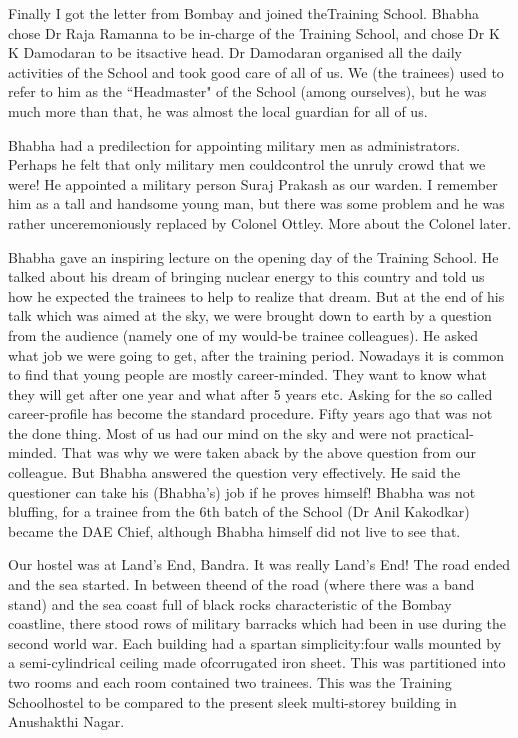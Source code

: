 Finally I got the letter from Bombay and joined the\break Training School. Bhabha chose Dr Raja Ramanna to be in-charge of the Training School, and chose Dr K K Damodaran to be its\break active head. Dr Damodaran organised all the daily activities of the School and took good care of all of us. We (the trainees) used to refer to him as the ``Headmaster" of the School (among ourselves), but he was much more than that, he was almost the local guardian for all of us.
 
Bhabha had a predilection for appointing military men as admini\-strators. Perhaps he felt that only military men could\break control the unruly crowd that we were! He appointed a military person Suraj Prakash as our warden. I remember him as a tall and handsome young man, but there was some problem and he was rather unceremoniously replaced by Colonel Ottley. More about the Colonel later.

Bhabha gave an inspiring lecture on the opening day of the Training School. He talked about his dream of bringing nuclear energy to this country and told us how he expected the trainees to help to realize that dream. But at the end of his talk which was aimed at the sky, we were brought down to earth by a question from the audience (namely  one of my would-be trainee collea\-gues). He asked what job we were going to get, after the training period. Nowadays it is common to find that young people are mostly career-minded. They want to know what they will get after one year and what after 5 years etc. Asking for the so called career-profile has become the standard procedure. Fifty years ago that was not the done thing. Most of us had our mind on the sky and were not practical-minded. That was why we were taken aback by the above question from our colleague. But  Bhabha answered the question very effectively. He said the questioner can take his (Bhabha's) job if he proves himself! Bhabha was not bluffing, for a trainee from the 6th batch of the School (Dr Anil Kakodkar) became the DAE Chief, although Bhabha himself did not live to see that.


Our hostel was at Land's End, Bandra. It was really Land's End! The road ended and the sea started. In between the\break end of the road (where there was a band stand) and the sea coast full of black rocks characteristic of the Bombay coastline, there stood rows of military barracks which had been in use during the second world war. Each building had a spartan simplicity:\break four walls mounted by a semi-cylindrical ceiling made of\break corrugated iron sheet. This was partitioned into two rooms and each room contained two trainees. This was the Training School\break hostel to be compared to the present sleek multi-storey building in Anushakthi Nagar.

